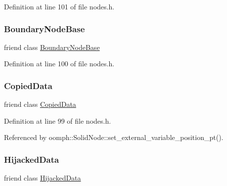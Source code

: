 Definition at line 101 of file nodes.\+h.

\mbox{\label{classoomph_1_1Data_a3d5c6d911301ca1704ce34955d8b3c6b}} 
\subsubsection{\texorpdfstring{Boundary\+Node\+Base}{BoundaryNodeBase}}
{\footnotesize\ttfamily friend class \hyperlink{classoomph_1_1BoundaryNodeBase}{Boundary\+Node\+Base}\hspace{0.3cm}{\ttfamily [friend]}}



Definition at line 100 of file nodes.\+h.

\mbox{\label{classoomph_1_1Data_a68cfdb0f861066a7be74be2524466388}} 
\subsubsection{\texorpdfstring{Copied\+Data}{CopiedData}}
{\footnotesize\ttfamily friend class \hyperlink{classoomph_1_1CopiedData}{Copied\+Data}\hspace{0.3cm}{\ttfamily [friend]}}



Definition at line 99 of file nodes.\+h.



Referenced by oomph\+::\+Solid\+Node\+::set\+\_\+external\+\_\+variable\+\_\+position\+\_\+pt().

\mbox{\label{classoomph_1_1Data_a45b7c97b9e9c5f94eb2a9efeae2dbc08}} 
\subsubsection{\texorpdfstring{Hijacked\+Data}{HijackedData}}
{\footnotesize\ttfamily friend class \hyperlink{classoomph_1_1HijackedData}{Hijacked\+Data}\hspace{0.3cm}{\ttfamily [friend]}}




